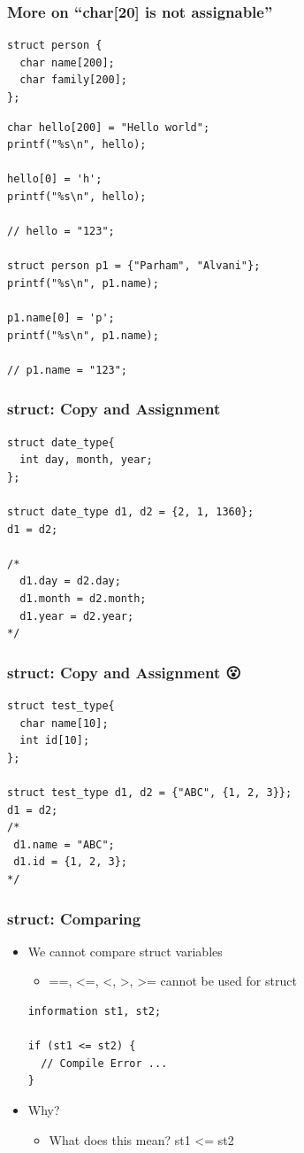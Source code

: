 \documentclass{../c-lecture}
\begin{document}
\begin{frame}[fragile]
  \frametitle{More on ``char[20] is not assignable''}
  \begin{verbatim}
struct person {
  char name[200];
  char family[200];
};
  \end{verbatim}
  \scriptsize
  \begin{verbatim}
char hello[200] = "Hello world";
printf("%s\n", hello);

hello[0] = 'h';
printf("%s\n", hello);

// hello = "123";

struct person p1 = {"Parham", "Alvani"};
printf("%s\n", p1.name);

p1.name[0] = 'p';
printf("%s\n", p1.name);

// p1.name = "123";
  \end{verbatim}
\end{frame}

\begin{frame}[fragile]
  \frametitle{struct: Copy and Assignment}
  \begin{verbatim}
struct date_type{
  int day, month, year;
};

struct date_type d1, d2 = {2, 1, 1360};
d1 = d2;

/*
  d1.day = d2.day;
  d1.month = d2.month;
  d1.year = d2.year;
*/
  \end{verbatim}
\end{frame}

\begin{frame}[fragile]
  \frametitle{struct: Copy and Assignment 😮}
  \begin{verbatim}
struct test_type{
  char name[10];
  int id[10];
};

struct test_type d1, d2 = {"ABC", {1, 2, 3}};
d1 = d2;
/*
 d1.name = "ABC";
 d1.id = {1, 2, 3};
*/

  \end{verbatim}
\end{frame}

\begin{frame}[fragile]
  \frametitle{struct: Comparing}
  \begin{itemize}
    \item
      We cannot compare struct variables
    \begin{itemize}
      \item ==, <=, <, >, >= cannot be used for struct
    \end{itemize}
    \begin{verbatim}
information st1, st2;

if (st1 <= st2) {
  // Compile Error ...
}

    \end{verbatim}
    \item Why?
    \begin{itemize}
      \item What does this mean? st1 <= st2
    \end{itemize}
  \end{itemize}
\end{frame}
\end{document}
